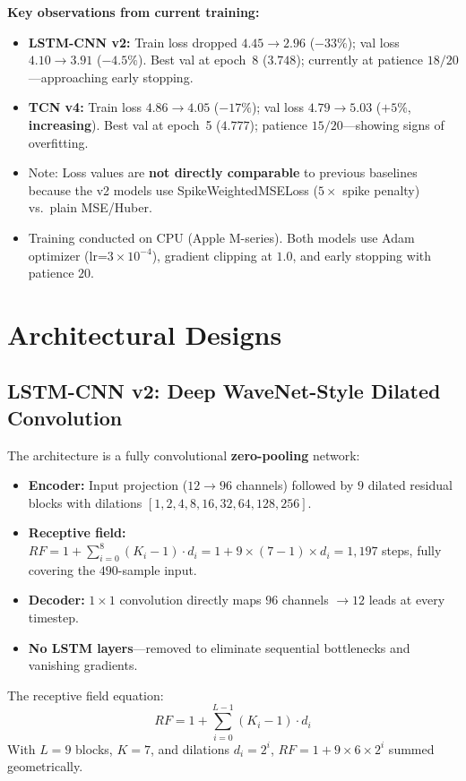 \documentclass[10pt,journal,compsoc]{IEEEtran}
\begin{document}
\noindent \textbf{Key observations from current training:}
\begin{itemize}
    \item \textbf{LSTM-CNN v2:} Train loss dropped $4.45 \to 2.96$ ($-33\%$); val loss $4.10 \to 3.91$ ($-4.5\%$). Best val at epoch~8 ($3.748$); currently at patience $18/20$---approaching early stopping.
    \item \textbf{TCN v4:} Train loss $4.86 \to 4.05$ ($-17\%$); val loss $4.79 \to 5.03$ ($+5\%$, \textbf{increasing}). Best val at epoch~5 ($4.777$); patience $15/20$---showing signs of overfitting.
    \item Note: Loss values are \textbf{not directly comparable} to previous baselines because the v2 models use SpikeWeightedMSELoss ($5\times$ spike penalty) vs.\ plain MSE/Huber.
    \item Training conducted on CPU (Apple M-series). Both models use Adam optimizer (lr=$3 \times 10^{-4}$), gradient clipping at $1.0$, and early stopping with patience $20$.
\end{itemize}

\section{Architectural Designs}

\subsection{LSTM-CNN v2: Deep WaveNet-Style Dilated Convolution}
\label{sec:wn}

The architecture is a fully convolutional \textbf{zero-pooling} network:
\begin{itemize}
    \item \textbf{Encoder:} Input projection ($12 \to 96$ channels) followed by $9$ dilated residual blocks with dilations $[1, 2, 4, 8, 16, 32, 64, 128, 256]$.
    \item \textbf{Receptive field:} $RF = 1 + \sum_{i=0}^{8}(K_i - 1)\cdot d_i = 1 + 9 \times (7-1) \times d_i = 1{,}197$ steps, fully covering the $490$-sample input.
    \item \textbf{Decoder:} $1\times 1$ convolution directly maps $96$ channels $\to 12$ leads at every timestep.
    \item \textbf{No LSTM layers}---removed to eliminate sequential bottlenecks and vanishing gradients.
\end{itemize}
The receptive field equation:
\begin{equation}
    RF = 1 + \sum_{i=0}^{L-1} (K_i - 1) \cdot d_i
\end{equation}
With $L=9$ blocks, $K=7$, and dilations $d_i = 2^i$, $RF = 1 + 9 \times 6 \times 2^i$ summed geometrically.
\end{document}
